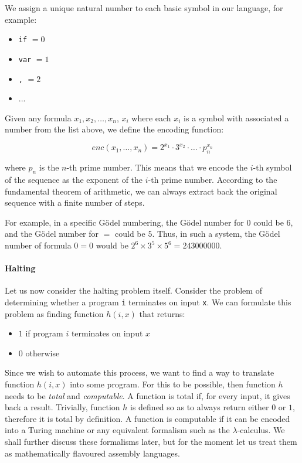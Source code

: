 We assign a unique natural number to each basic symbol in our language, for example:
\begin{itemize}
\item \texttt{if} $=0$
\item \texttt{var} $=1$
\item \texttt{,} $=2$
\item ...
\end{itemize}

Given any formula $x_1,x_2,\dots,x_n$, $x_i$ where each $x_i$ is a symbol with associated a number from the list above, we define the encoding function:

$$enc(x_1,\dots,x_n)=2^{x_1} \cdot3^{x_2} \cdot \dots \cdot p_n^{x_n}$$

where $p_n$ is the $n$-th prime number. This means that we encode the $i$-th symbol of the sequence as the exponent of the $i$-th prime number. According to the fundamental theorem of arithmetic, we can always extract back the original sequence with a finite number of steps.

For example, in a specific Gödel numbering, the Gödel number for $0$ could be $6$, and the Gödel number for $=$ could be $5$. Thus, in such a system, the Gödel number of formula $0 = 0$ would be $2^6 \times 3^5 \times 5^6 = 243000000$.


\paragraph{Halting}
Let us now consider the halting problem itself. Consider the problem of determining whether a program \texttt{i} terminates on input \texttt{x}. We can formulate this problem as finding function $h(i,x)$ that returns:

\begin{itemize}
\item $1$ if program $i$ terminates on input $x$
\item $0$ otherwise
\end{itemize}

Since we wish to automate this process, we want to find a way to translate function $h(i,x)$ into some program. For this to be possible, then function $h$ needs to be \textit{total} and \textit{computable}. A function is total if, for every input, it gives back a result. Trivially, function $h$ is defined so as to always return either $0$ or $1$, therefore it is total by definition. A function is computable if it can be encoded into a Turing machine or any equivalent formalism such as the $\lambda$-calculus. We shall further discuss these formalisms later, but for the moment let us treat them as mathematically flavoured assembly languages.


